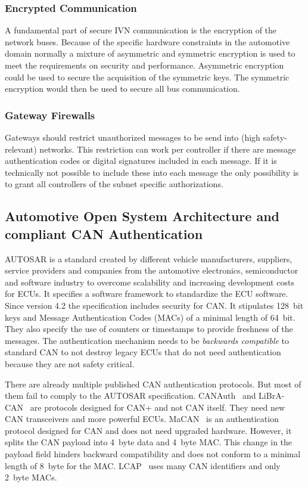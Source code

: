 \subsubsection{Encrypted Communication}

A fundamental part of secure IVN communication is the encryption of the network
buses. Because of the specific hardware constraints in the automotive domain
normally a mixture of asymmetric and symmetric encryption is used to meet the
requirements on security and performance. Asymmetric encryption could be used to
secure the acquisition of the symmetric keys. The symmetric encryption would
then be used to secure all bus communication.

\subsubsection{Gateway Firewalls}

Gateways should restrict unauthorized messages to be send into (high
safety-relevant) networks. This restriction can work per controller if there are
message authentication codes or digital signatures included in each message. If
it is technically not possible to include these into each message the only
possibility is to grant all controllers of the subnet specific authorizations.

\subsection{Automotive Open System Architecture and compliant CAN Authentication} 

AUTOSAR is a standard created by different vehicle manufacturers, suppliers,
service providers and companies from the automotive electronics, semiconductor
and software industry to overcome scalability and increasing development costs
for ECUs. It specifies a software framework to standardize the ECU software.
Since version 4.2 the specification includes security for CAN\@. It stipulates
128~bit keys and Message Authentication Codes (MACs) of a minimal length of
64~bit. They also specify the use of counters or timestamps to provide freshness of
the messages. The authentication mechanism needs to be \textit{backwards
compatible} to standard CAN to not destroy legacy ECUs that do not need
authentication because they are not safety critical.

There are already multiple published CAN authentication protocols. But most of
them fail to comply to the AUTOSAR specification. CANAuth~\cite{Herrewege2011}
and LiBrA-CAN~\cite{Groza2012} are protocols designed for CAN+ and not CAN
itself. They need new CAN transceivers and more powerful ECUs.
MaCAN~\cite{Bruni2014} is an authentication protocol designed for CAN and does
not need upgraded hardware. However, it splits the CAN payload into 4~byte data
and 4~byte MAC\@. This change in the payload field hinders backward
compatibility and does not conform to a minimal length of 8~byte for the MAC\@.
LCAP~\cite{Hazem2012} uses many CAN identifiers and only 2~byte MACs. 

